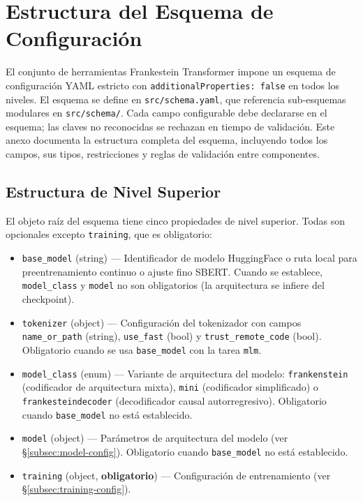 \section{Estructura del Esquema de Configuración}
\label{sec:annex-schema}

El conjunto de herramientas Frankestein Transformer impone un esquema de configuración YAML estricto con \texttt{additionalProperties: false} en todos los niveles. El esquema se define en \texttt{src/schema.yaml}, que referencia sub-esquemas modulares en \texttt{src/schema/}. Cada campo configurable debe declararse en el esquema; las claves no reconocidas se rechazan en tiempo de validación. Este anexo documenta la estructura completa del esquema, incluyendo todos los campos, sus tipos, restricciones y reglas de validación entre componentes.

\subsection{Estructura de Nivel Superior}

El objeto raíz del esquema tiene cinco propiedades de nivel superior. Todas son opcionales excepto \texttt{training}, que es obligatorio:

\begin{itemize}[nosep]
    \item \texttt{base\_model} (string) --- Identificador de modelo HuggingFace o ruta local para preentrenamiento continuo o ajuste fino SBERT. Cuando se establece, \texttt{model\_class} y \texttt{model} no son obligatorios (la arquitectura se infiere del checkpoint).
    \item \texttt{tokenizer} (object) --- Configuración del tokenizador con campos \texttt{name\_or\_path} (string), \texttt{use\_fast} (bool) y \texttt{trust\_remote\_code} (bool). Obligatorio cuando se usa \texttt{base\_model} con la tarea \texttt{mlm}.
    \item \texttt{model\_class} (enum) --- Variante de arquitectura del modelo: \texttt{frankenstein} (codificador de arquitectura mixta), \texttt{mini} (codificador simplificado) o \texttt{frankesteindecoder} (decodificador causal autorregresivo). Obligatorio cuando \texttt{base\_model} no está establecido.
    \item \texttt{model} (object) --- Parámetros de arquitectura del modelo (ver \S\ref{subsec:model-config}). Obligatorio cuando \texttt{base\_model} no está establecido.
    \item \texttt{training} (object, \textbf{obligatorio}) --- Configuración de entrenamiento (ver \S\ref{subsec:training-config}).
\end{itemize}

